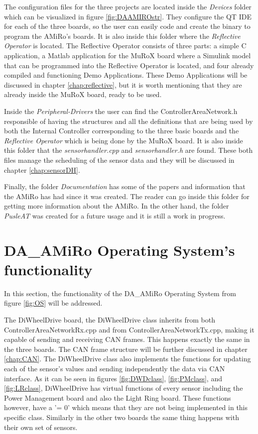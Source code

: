 \documentclass[12pt]{report}%
\begin{document}
The configuration files for the three projects are located inside the \textit{Devices} folder which can be visualized in figure \ref{fig:DAAMIROstr}. They configure the QT IDE for each of the three boards, so the user can easily code and create the binary to program the AMiRo's boards. It is also inside this folder where the \textit{Reflective Operator} is located. The Reflective Operator consists of three parts: a simple C application, a Matlab application for the MuRoX board where a Simulink model that can be programmed into the Reflective Operator is located, and four already compiled and functioning Demo Applications. These Demo Applications will be discussed in chapter \ref{chap:reflective}, but it is worth mentioning that they are already inside the MuRoX board, ready to be used.

Inside the \textit{Peripheral-Drivers} the user can find the ControllerAreaNetwork.h responsible of having the structures and all the definitions that are being used by both the Internal Controller corresponding to the three basic boards and the \textit{Reflective Operator} which is being done by the MuRoX board. It is also inside this folder that the \textit{sensorhandler.cpp} and \textit{sensorhandler.h} are found. These both files manage the scheduling of the sensor data and they will be discussed in chapter \ref{chap:sensorDH}.

Finally, the folder \textit{Documentation} has some of the papers and information that the AMiRo has had since it was created. The reader can go inside this folder for getting more information about the AMiRo. In the other hand, the folder \textit{PusleAT} was created for a future usage and it is still a work in progress.

\section{DA\_AMiRo Operating System's functionality}
\label{sub:DAAMIROOS}
In this section, the functionality of the DA\_AMiRo Operating System from figure \ref{fig:OS} will be addressed.

The DiWheelDrive board, the DiWheelDrive class inherits from both ControllerAreaNetworkRx.cpp and from ControllerAreaNetworkTx.cpp, making it capable of sending and receiving CAN frames. This happens exactly the same in the three boards. The CAN frame structure will be further discussed in chapter \ref{chap:CAN}. The DiWheelDrive class also implements the functions for updating each of the sensor's values and sending independently the data via CAN interface. As it can be seen in figures \ref{fig:DWDclass}, \ref{fig:PMclass}, and \ref{fig:LRclass}, DiWheelDrive has virtual functions of every sensor including the Power Management board and also the Light Ring board. These functions however, have a '= 0' which means that they are not being implemented in this specific class. Similarly in the other two boards the same thing happens with their own set of sensors.
\end{document}
